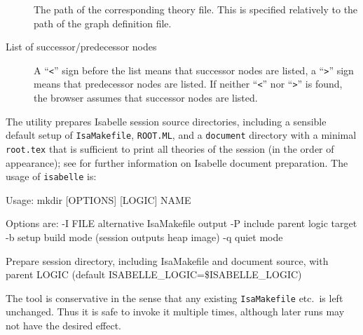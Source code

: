\begin{isabellebody}
\begin{isamarkuptext}
\begin{description}
  \item[] The path of the corresponding theory file. This
  is specified relatively to the path of the graph definition file.
  
  \item[List of successor/predecessor nodes] A ``\verb|<|''
  sign before the list means that successor nodes are listed, a
  ``\verb|>|'' sign means that predecessor nodes are listed. If
  neither ``\verb|<|'' nor ``\verb|>|'' is found, the
  browser assumes that successor nodes are listed.

  \end{description}%
\end{isamarkuptext}%
\isamarkuptrue%
%
\isamarkuptrue%
%
\begin{isamarkuptext}%
The \hypertarget{tool.mkdir}{\hyperlink{tool.mkdir}{\mbox{}}} utility prepares Isabelle session source
  directories, including a sensible default setup of \verb|IsaMakefile|, \verb|ROOT.ML|, and a \verb|document|
  directory with a minimal \verb|root.tex| that is sufficient to
  print all theories of the session (in the order of appearance); see
   for further information on Isabelle
  document preparation.  The usage of \verb|isabelle| \hyperlink{tool.mkdir}{\mbox{}} is:

\begin{ttbox}
Usage: mkdir [OPTIONS] [LOGIC] NAME

  Options are:
    -I FILE      alternative IsaMakefile output
    -P           include parent logic target
    -b           setup build mode (session outputs heap image)
    -q           quiet mode

  Prepare session directory, including IsaMakefile and document source,
  with parent LOGIC (default ISABELLE_LOGIC=\$ISABELLE_LOGIC)
\end{ttbox}

  The \hyperlink{tool.mkdir}{\mbox{}} tool is conservative in the sense that any
  existing \verb|IsaMakefile| etc.\ is left unchanged.  Thus it
  is safe to invoke it multiple times, although later runs may not
  have the desired effect.


\end{isamarkuptext}
\end{isabellebody}

